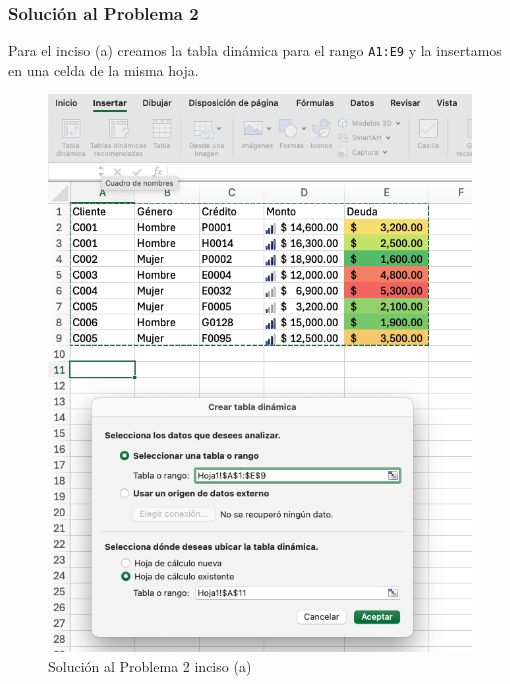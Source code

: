 \documentclass{article}
\begin{document}
\clearpage

\subsubsection*{Solución al Problema 2}

Para el inciso (a) creamos la tabla dinámica para el rango \texttt{A1:E9} y la insertamos en una celda de la misma hoja.
\begin{figure}[!h]
    \centering
    \begin{minipage}{\textwidth}
        \centering
        \includegraphics[width=\textwidth]{figures/s102-1.png}
    \end{minipage}
    \captionsetup{width=0.9\textwidth}
    \caption{Solución al Problema 2 inciso (a)}
    \label{fig:s102-1}
\end{figure}
\end{document}
